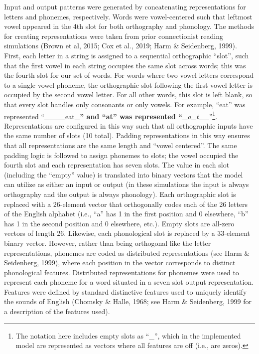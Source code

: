 \documentclass[
  ,man,floatsintext]{apa6}
\begin{document}
Input and output patterns were generated by concatenating representations for letters and phonemes, respectively. Words were vowel-centered such that leftmost vowel appeared in the 4th slot for both orthography and phonology. The methods for creating representations were taken from prior connectionist reading simulations (Brown et al, 2015; Cox et al., 2019; Harm \& Seidenberg, 1999). First, each letter in a string is assigned to a sequential orthographic ``slot'', such that the first vowel in each string occupies the same slot across words; this was the fourth slot for our set of words. For words where two vowel letters correspond to a single vowel phoneme, the orthographic slot following the first vowel letter is occupied by the second vowel letter. For all other words, this slot is left blank, so that every slot handles only consonants or only vowels. For example, ``eat'' was represented ``\_\_\_\_eat\_\textbf{'' and ``at'' was represented ``}\_\emph{a\_t}\_\_''\footnote{The notation here includes empty slots as ``\_'', which in the implemented model are represented as vectors where all features are off (i.e., are zeros).}. Representations are configured in this way such that all orthographic inputs have the same number of slots (10 total). Padding representations in this way ensures that all representations are the same length and ``vowel centered''. The same padding logic is followed to assign phonemes to slots; the vowel occupied the fourth slot and each representation has seven slots. The value in each slot (including the ``empty'' value) is translated into binary vectors that the model can utilize as either an input or output (in these simulations the input is always orthography and the output is always phonology). Each orthographic slot is replaced with a 26-element vector that orthogonally codes each of the 26 letters of the English alphabet (i.e., ``a'' has 1 in the first position and 0 elsewhere, ``b'' has 1 in the second position and 0 elsewhere, etc.). Empty slots are all-zero vectors of length 26. Likewise, each phonological slot is replaced by a 33-element binary vector. However, rather than being orthogonal like the letter representations, phonemes are coded as distributed representations (see Harm \& Seidenberg, 1999), where each position in the vector corresponds to distinct phonological features. Distributed representations for phonemes were used to represent each phoneme for a word situated in a seven slot output representation. Features were defined by standard distinctive features used to uniquely identify the sounds of English (Chomsky \& Halle, 1968; see Harm \& Seidenberg, 1999 for a description of the features used).
\end{document}
